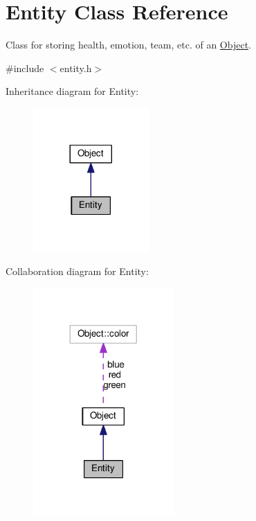 \hypertarget{classEntity}{}\section{Entity Class Reference}
\label{classEntity}


Class for storing health, emotion, team, etc. of an \hyperlink{classObject}{Object}.  




{\ttfamily \#include $<$entity.\+h$>$}



Inheritance diagram for Entity\+:\nopagebreak
\begin{figure}[H]
\begin{center}
\leavevmode
\includegraphics[width=125pt]{classEntity__inherit__graph}
\end{center}
\end{figure}


Collaboration diagram for Entity\+:\nopagebreak
\begin{figure}[H]
\begin{center}
\leavevmode
\includegraphics[width=152pt]{classEntity__coll__graph}
\end{center}
\end{figure}
